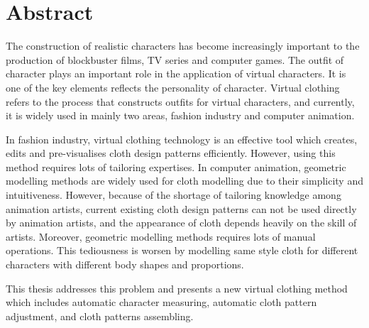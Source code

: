 
\ifx\isEmbedded\undefined


\fi

\pagebreak

\chapter*{Abstract}


The construction of realistic characters has become increasingly important to the production of blockbuster films, TV series and computer games. The outfit of character plays an important role in the application of virtual characters. It is one of the key elements reflects the personality of character. Virtual clothing refers to the process that constructs outfits for virtual characters, and currently, it is widely used in mainly two areas, fashion industry and computer animation. 

In fashion industry, virtual clothing technology is an effective tool which creates, edits and pre-visualises cloth design patterns efficiently. However, using this method requires lots of tailoring expertises. In computer animation, geometric modelling methods are widely used for cloth modelling due to their simplicity and intuitiveness. However, because of the shortage of tailoring knowledge among animation artists, current existing cloth design patterns can not be used directly by animation artists, and the appearance of cloth depends heavily on the skill of artists. Moreover, geometric modelling methods requires lots of manual operations. This tediousness is worsen by modelling same style cloth for different characters with different body shapes and proportions.

This thesis addresses this problem and presents a new virtual clothing method which includes automatic character measuring, automatic cloth pattern adjustment, and cloth patterns assembling. 

